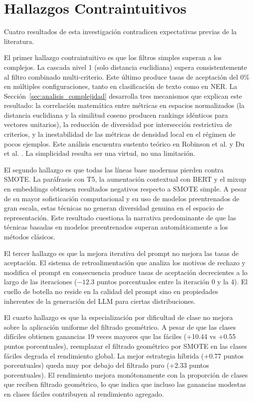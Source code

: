 \section{Hallazgos Contraintuitivos}
\label{sec:hallazgos_contraintuitivos}

Cuatro resultados de esta investigación contradicen expectativas previas de la literatura.

El primer hallazgo contraintuitivo es que los filtros simples superan a los complejos. La cascada nivel 1 (solo distancia euclidiana) supera consistentemente al filtro combinado multi-criterio. Este último produce tasas de aceptación del 0\% en múltiples configuraciones, tanto en clasificación de texto como en NER. La Sección~\ref{sec:analisis_complejidad} desarrolla tres mecanismos que explican este resultado: la correlación matemática entre métricas en espacios normalizados (la distancia euclidiana y la similitud coseno producen rankings idénticos para vectores unitarios), la reducción de diversidad por intersección restrictiva de criterios, y la inestabilidad de las métricas de densidad local en el régimen de pocos ejemplos. Este análisis encuentra sustento teórico en Robinson et al. \cite{robinson2025manifold} y Du et al. \cite{du2025disentangling}. La simplicidad resulta ser una virtud, no una limitación.

El segundo hallazgo es que todas las líneas base modernas pierden contra SMOTE. La paráfrasis con T5, la aumentación contextual con BERT y el mixup en embeddings obtienen resultados negativos respecto a SMOTE simple. A pesar de su mayor sofisticación computacional y su uso de modelos preentrenados de gran escala, estas técnicas no generan diversidad genuina en el espacio de representación. Este resultado cuestiona la narrativa predominante de que las técnicas basadas en modelos preentrenados superan automáticamente a los métodos clásicos.

El tercer hallazgo es que la mejora iterativa del prompt no mejora las tasas de aceptación. El sistema de retroalimentación que analiza los motivos de rechazo y modifica el prompt en consecuencia produce tasas de aceptación decrecientes a lo largo de las iteraciones ($-12.3$ puntos porcentuales entre la iteración 0 y la 4). El cuello de botella no reside en la calidad del prompt sino en propiedades inherentes de la generación del LLM para ciertas distribuciones.

El cuarto hallazgo es que la especialización por dificultad de clase no mejora sobre la aplicación uniforme del filtrado geométrico. A pesar de que las clases difíciles obtienen ganancias 19 veces mayores que las fáciles (+10.44 vs +0.55 puntos porcentuales), reemplazar el filtrado geométrico por SMOTE en las clases fáciles degrada el rendimiento global. La mejor estrategia híbrida (+0.77 puntos porcentuales) queda muy por debajo del filtrado puro (+2.33 puntos porcentuales). El rendimiento mejora monótonamente con la proporción de clases que reciben filtrado geométrico, lo que indica que incluso las ganancias modestas en clases fáciles contribuyen al rendimiento agregado.

